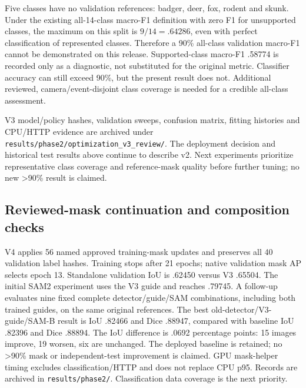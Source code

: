 \documentclass[11pt,a4paper]{article}
\begin{document}
Five classes have no validation references: badger, deer, fox, rodent and skunk. Under the existing all-14-class macro-F1 definition with zero F1 for unsupported classes, the maximum on this split is $9/14=.64286$, even with perfect classification of represented classes. Therefore a 90\% all-class validation macro-F1 cannot be demonstrated on this release. Supported-class macro-F1 .58774 is recorded only as a diagnostic, not substituted for the original metric. Classifier accuracy can still exceed 90\%, but the present result does not. Additional reviewed, camera/event-disjoint class coverage is needed for a credible all-class assessment.

V3 model/policy hashes, validation sweeps, confusion matrix, fitting histories and CPU/HTTP evidence are archived under \texttt{results/phase2/optimization\_v3\_review/}. The deployment decision and historical test results above continue to describe v2. Next experiments prioritize representative class coverage and reference-mask quality before further tuning; no new >90\% result is claimed.

\subsection*{Reviewed-mask continuation and composition checks}
V4 applies 56 named approved training-mask updates and preserves all 40 validation label hashes. Training stops after 21 epochs; native validation mask AP selects epoch 13. Standalone validation IoU is .62450 versus V3 .65504. The initial SAM2 experiment uses the V3 guide and reaches .79745. A follow-up evaluates nine fixed complete detector/guide/SAM combinations, including both trained guides, on the same original references. The best old-detector/V3-guide/SAM-B result is IoU .82466 and Dice .88947, compared with baseline IoU .82396 and Dice .88894. The IoU difference is .0692 percentage points: 15 images improve, 19 worsen, six are unchanged. The deployed baseline is retained; no >90\% mask or independent-test improvement is claimed. GPU mask-helper timing excludes classification/HTTP and does not replace CPU p95. Records are archived in \texttt{results/phase2/}. Classification data coverage is the next priority.
\end{document}
